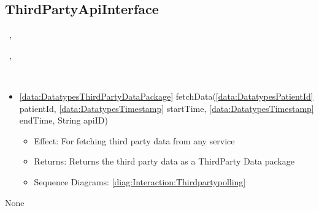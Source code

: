   \subsection{ThirdPartyApiInterface}\label{int:InterfacesThirdPartyApiInterface}
    \begin{description}
      \item[Provided by:] \iconcomponent{}~, \iconcomponent{}~
      \item[Required by:] \iconcomponent{}~, \iconcomponent{}~ 
      \item[Operations:] ~
    \begin{itemize}[noitemsep,nolistsep,leftmargin=-.25cm]
      \item \textsf{\ref{data:DatatypesThirdPartyDataPackage} fetchData(\ref{data:DatatypesPatientId} patientId, \ref{data:DatatypesTimestamp} startTime, \ref{data:DatatypesTimestamp} endTime, String apiID)}
        \begin{itemize}[noitemsep,nolistsep]
           \item Effect: For fetching third party data from any service 
           \item Returns: Returns the third party data as a ThirdParty Data package
           \item Sequence Diagrams: \cref{diag:Interaction:Thirdpartypolling}
        \end{itemize}
    \end{itemize}
      \item[Diagrams:] None
    \end{description}


